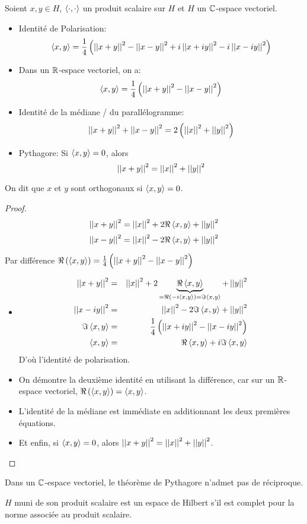 \begin{prop}
	Soient $x,y \in H$, $\left\langle \cdot, \cdot \right\rangle$ un produit scalaire sur $H$ et $H$ un $\mathbb{C}$-espace vectoriel.

	\begin{itemize}
		\item Identité de Polarisation:
		      $$\left\langle x, y \right\rangle = \frac{1}{4} \left( \left|\left|x+y\right|\right|^2 - \left|\left|x-y\right|\right|^2 + i\left|\left|x+iy\right|\right|^2 - i\left|\left|x-iy\right|\right|^2 \right)$$
		\item Dans un $\mathbb{R}$-espace vectoriel, on a:
		      $$\left\langle x, y \right\rangle = \frac{1}{4} \left( \left|\left|x+y\right|\right|^2 - \left|\left|x-y\right|\right|^2 \right)$$
		\item Identité de la médiane / du parallélogramme:
		      $$\left|\left|x+y\right|\right|^2 + \left|\left|x-y\right|\right|^2 = 2\left( \left|\left|x\right|\right|^2 + \left|\left|y\right|\right|^2 \right)$$
		\item Pythagore: Si $\left\langle x, y \right\rangle = 0$, alors
		      $$ \left|\left|x+y\right|\right|^2 = \left|\left|x\right|\right|^2 + \left|\left|y\right|\right|^2$$
	\end{itemize}
\end{prop}

\begin{definition}
	On dit que $x$ et $y$ sont orthogonaux si $\left\langle x, y \right\rangle = 0$.
\end{definition}

\begin{proof}
	$$\left|\left|x+y\right|\right|^2  = \left|\left|x\right|\right|^2 + 2\Re \left\langle x, y \right\rangle + \left|\left|y\right|\right|^2 $$
	$$\left|\left|x-y\right|\right|^2  = \left|\left|x\right|\right|^2 - 2\Re \left\langle x, y \right\rangle + \left|\left|y\right|\right|^2 $$

	Par différence $\Re \left(\left\langle x, y \right\rangle\right) = \frac{1}{4} \left( \left|\left|x+y\right|\right|^2 - \left|\left|x-y\right|\right|^2 \right)$
	\begin{itemize}
		\item
		      \begin{eqnarray*}
			      \left|\left|x+y\right|\right|^2  &=& \left|\left|x\right|\right|^2 + 2\underbrace{\Re \left\langle x, y \right\rangle }_{= \Re (-i\left\langle x, y \right\rangle) = \Im \left\langle x, y \right\rangle} + \left|\left|y\right|\right|^2 \\
			      \left|\left|x-iy\right|\right|^2 &=& \left|\left|x\right|\right|^2 - 2\Im \left\langle x, y \right\rangle + \left|\left|y\right|\right|^2 \\
			      \Im \left\langle x, y \right\rangle &=& \frac{1}{4} \left( \left|\left|x+iy\right|\right|^2 - \left|\left|x-iy\right|\right|^2 \right)\\
			      \left\langle x, y \right\rangle &=& \Re \left\langle x, y \right\rangle + i \Im \left\langle x, y \right\rangle
		      \end{eqnarray*}
		      D'où l'identité de polarisation.
		\item On démontre la deuxième identité en utilisant la différence, car sur un $\mathbb{R}$-espace vectoriel, $\Re \left(\left\langle x, y \right\rangle\right) = \left\langle x, y \right\rangle$.
		\item L'identité de la médiane est immédiate en additionnant les deux premières équations.
		\item Et enfin, si $\left\langle x, y \right\rangle = 0$, alors $\left|\left|x+y\right|\right|^2 = \left|\left|x\right|\right|^2 + \left|\left|y\right|\right|^2$.
	\end{itemize} %
\end{proof}


\begin{remarque}
	Dans un $\mathbb{C}$-espace vectoriel, le théorème de Pythagore n'admet pas de réciproque.
\end{remarque}

\begin{definition}
	$H$ muni de son produit scalaire est un espace de Hilbert s'il est complet pour la norme associée au produit scalaire.
\end{definition}

